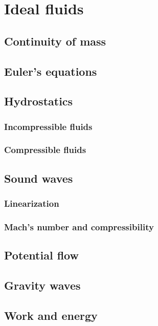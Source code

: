 \part{Ideal fluids}

\chapter{Continuity of mass}


\chapter{Euler's equations}



\chapter{Hydrostatics}

\section{Incompressible fluids}

\section{Compressible fluids}

\chapter{Sound waves}

\section{Linearization}

\section{Mach's number and compressibility}


\chapter{Potential flow}


\chapter{Gravity waves}



\chapter{Work and energy}


